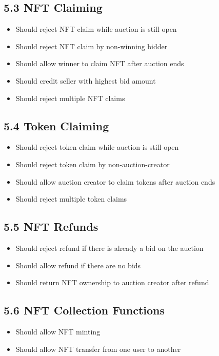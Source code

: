 \documentclass{article}
\begin{document}
\subsection*{5.3 NFT Claiming}
\begin{itemize}
  \item Should reject NFT claim while auction is still open
  \item Should reject NFT claim by non-winning bidder
  \item Should allow winner to claim NFT after auction ends
  \item Should credit seller with highest bid amount
  \item Should reject multiple NFT claims
\end{itemize}

\subsection*{5.4 Token Claiming}
\begin{itemize}
  \item Should reject token claim while auction is still open
  \item Should reject token claim by non-auction-creator
  \item Should allow auction creator to claim tokens after auction ends
  \item Should reject multiple token claims
\end{itemize}

\subsection*{5.5 NFT Refunds}
\begin{itemize}
  \item Should reject refund if there is already a bid on the auction
  \item Should allow refund if there are no bids
  \item Should return NFT ownership to auction creator after refund
\end{itemize}

\subsection*{5.6 NFT Collection Functions}
\begin{itemize}
  \item Should allow NFT minting
  \item Should allow NFT transfer from one user to another
\end{itemize}
\end{document}
